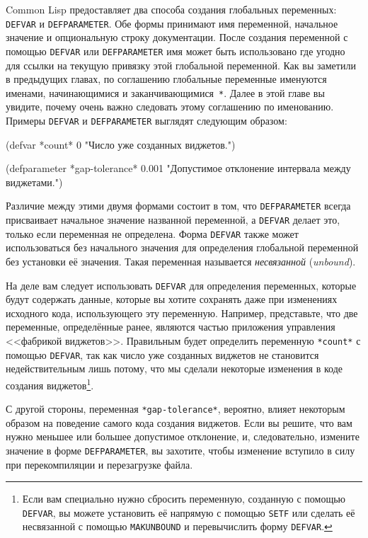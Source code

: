 Common Lisp предоставляет два способа создания глобальных переменных: \lstinline{DEFVAR} и
\lstinline{DEFPARAMETER}. Обе формы принимают имя переменной, начальное значение и
опциональную строку документации. После создания переменной с помощью \lstinline{DEFVAR} или
\lstinline{DEFPARAMETER} имя может быть использовано где угодно для ссылки на текущую
привязку этой глобальной переменной. Как вы заметили в предыдущих главах, по соглашению
глобальные переменные именуются именами, начинающимися и заканчивающимися~\lstinline{*}.  Далее в этой
главе вы увидите, почему очень важно следовать этому соглашению по именованию. Примеры
\lstinline{DEFVAR} и \lstinline{DEFPARAMETER} выглядят следующим образом:

\begin{myverb}
(defvar *count* 0
  "Число уже созданных виджетов.")

(defparameter *gap-tolerance* 0.001
  "Допустимое отклонение интервала между виджетами.")
\end{myverb}

Различие между этими двумя формами состоит в том, что \lstinline{DEFPARAMETER} всегда
присваивает начальное значение названной переменной, а \lstinline{DEFVAR} делает это, только
если переменная не определена. Форма \lstinline{DEFVAR} также может использоваться без
начального значения для определения глобальной переменной без установки её значения. Такая
переменная называется \textit{несвязанной} (\textit{unbound}).

На деле вам следует использовать \lstinline{DEFVAR} для определения переменных, которые
будут содержать данные, которые вы хотите сохранять даже при изменениях исходного кода,
использующего эту переменную. Например, представьте, что две переменные, определённые
ранее, являются частью приложения управления <<фабрикой
виджетов>>. Правильным будет определить переменную \lstinline{*count*} с помощью
\lstinline{DEFVAR}, так как число уже созданных виджетов не становится недействительным
лишь потому, что мы сделали некоторые изменения в коде создания виджетов\footnote{Если вам
  специально нужно сбросить переменную, созданную с помощью \lstinline{DEFVAR}, вы можете
  установить её напрямую с помощью \lstinline{SETF} или сделать её несвязанной с помощью
  \lstinline{MAKUNBOUND} и перевычислить форму \lstinline{DEFVAR}.}\hspace{\footnotenegspace}.

С другой стороны, переменная \lstinline{*gap-tolerance*}, вероятно, влияет некоторым образом на
поведение самого кода создания виджетов. Если вы решите, что вам нужно меньшее или большее
допустимое отклонение, и, следовательно, измените значение в форме
\lstinline{DEFPARAMETER}, вы захотите, чтобы изменение вступило в силу при перекомпиляции
и перезагрузке файла.

